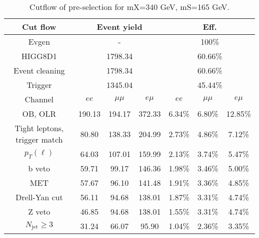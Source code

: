 \begin{table}
\centering\small
\begin{tabular}{c|ccc|ccc}
\hline
\hline
Cut flow &\multicolumn{3}{c|}{Event yield}&\multicolumn{3}{c}{Eff.}      \\
\hline
Evgen&\multicolumn{3}{c|}{-}&\multicolumn{3}{c}{100\%}\\
HIGG8D1&\multicolumn{3}{c|}{1798.34}&\multicolumn{3}{c}{60.66\%}\\
Event cleaning&\multicolumn{3}{c|}{1798.34}&\multicolumn{3}{c}{60.66\%}\\
Trigger&\multicolumn{3}{c|}{1345.04    }&\multicolumn{3}{c}{45.44\%}\\
Channel&$ee$&$\mu\mu$&$e\mu$&$ee$&$\mu\mu$&$e\mu$\\
\hline
OB, OLR    &190.13    &194.17    &372.33& 6.34\%    &6.80\%    &12.85\%\\
Tight leptons, trigger match    &80.80    &138.33    &204.99    &2.73\%    &4.86\%    &7.12\%\\
$p_T(\ell)$    &64.03    &107.01    &159.99    &2.13\%    &3.74\%    &5.47\%\\
b veto    &59.71    &99.17    &146.36    &1.98\%    &3.46\%    &5.00\%\\
MET    &57.67    &96.10    &141.48    &1.91\%    &3.36\%    &4.85\%\\
Drell-Yan cut    &56.11    &94.68    &138.01    &1.87\%    &3.31\%    &4.74\%\\
Z veto    &46.85    &94.68    &138.01    &1.55\%    &3.31\%    &4.74\%\\
$N_{\text{jet}}\geq3$    &31.24    &66.07    &95.90    &1.04\%    &2.36\%    &3.35\%\\
\hline
\hline
\end{tabular}
\caption{Cutflow of pre-selection for mX=340 GeV, mS=165 GeV.}
\label{tab:cut_flow_preselection_mX260}
\end{table}
